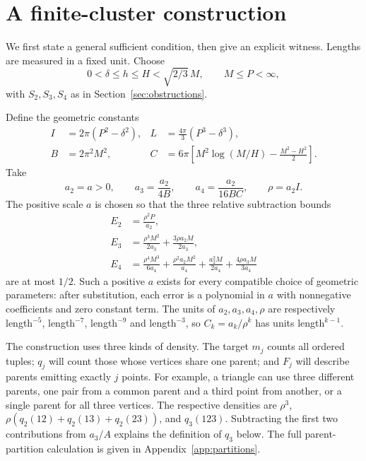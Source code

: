 \section{A finite-cluster construction}
\label{sec:construction}

We first state a general sufficient condition, then give an explicit witness. Lengths are measured in a fixed unit. Choose
\[
 0<\delta\leq h\leq H<\sqrt{2/3}\,M,\qquad M\leq P<\infty,
\]
with $S_2,S_3,S_4$ as in Section~\ref{sec:obstructions}.

Define the geometric constants
\begin{align}
 I&=2\pi(P^2-\delta^2), & L&=\frac{4\pi}{3}(P^3-\delta^3),\\
 B&=2\pi^2M^2, & C&=6\pi\left[M^2\log(M/H)-\frac{M^2-H^2}{2}\right].
 \label{eq:geom-constants}
\end{align}
Take
\begin{equation}
 a_2=a>0,\qquad
 a_3=\frac{a_2}{4B},\qquad
 a_4=\frac{a_2}{16BC},\qquad
 \rho=a_2I.
 \label{eq:amplitudes}
\end{equation}
The positive scale $a$ is chosen so that the three relative subtraction bounds
\begin{align*}
 E_2&=\frac{\rho^2P}{a_2},\\
 E_3&=\frac{\rho^3M^2}{2a_3}+\frac{3\rho a_2M}{2a_3},\\
 E_4&=\frac{\rho^4M^3}{6a_4}+\frac{\rho^2a_2M^2}{a_4}
       +\frac{a_2^2M}{2a_4}+\frac{4\rho a_3M}{3a_4}
\end{align*}
are at most $1/2$. Such a positive $a$ exists for every compatible choice of geometric parameters: after substitution, each error is a polynomial in $a$ with nonnegative coefficients and zero constant term. The units of $a_2,a_3,a_4,\rho$ are respectively length$^{-5}$, length$^{-7}$, length$^{-9}$ and length$^{-3}$, so $C_k=a_k/\rho^k$ has units length$^{k-1}$.

The construction uses three kinds of density. The target $m_j$ counts all ordered tuples; $q_j$ will count those whose vertices share one parent; and $F_j$ will describe parents emitting exactly $j$ points. For example, a triangle can use three different parents, one pair from a common parent and a third point from another, or a single parent for all three vertices. The respective densities are $\rho^3$, $\rho(q_2(12)+q_2(13)+q_2(23))$, and $q_3(123)$. Subtracting the first two contributions from $a_3/A$ explains the definition of $q_3$ below. The full parent-partition calculation is given in Appendix~\ref{app:partitions}.


